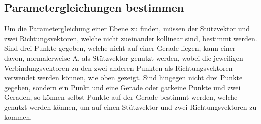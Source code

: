 \documentclass{article}
\begin{document}
\subsection{Parametergleichungen bestimmen}
Um die Parametergleichung einer Ebene zu finden, müssen der Stützvektor und zwei Richtungsvektoren, welche nicht zueinander kollinear sind, bestimmt werden. Sind drei Punkte gegeben, welche nicht auf einer Gerade liegen, kann einer davon, normalerweise $\mathrm{A}$, als Stützvektor genutzt werden, wobei die jeweiligen Verbindungsvektoren zu den zwei anderen Punkten als Richtungsvektoren verwendet werden können, wie oben gezeigt. \newline
Sind hingegen nicht drei Punkte gegeben, sondern ein Punkt und eine Gerade oder garkeine Punkte und zwei Geraden, so können selbst Punkte auf der Gerade bestimmt werden, welche genutzt werden können, um auf einen Stützvektor und zwei Richtungsvektoren zu kommen.
 
\end{document}
